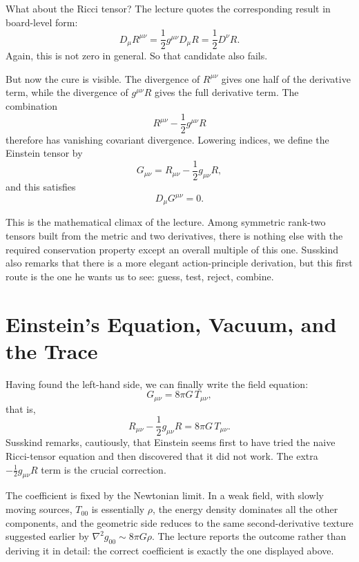 What about the Ricci tensor? The lecture quotes the corresponding result in board-level form:
\begin{equation}
D_\mu R^{\mu\nu}
=
\frac12 g^{\mu\nu}D_\mu R
=
\frac12 D^\nu R.
\end{equation}
Again, this is not zero in general. So that candidate also fails.

But now the cure is visible. The divergence of \(R^{\mu\nu}\) gives one half of the derivative term, while the divergence of \(g^{\mu\nu}R\) gives the full derivative term. The combination
\begin{equation}
R^{\mu\nu}-\frac12 g^{\mu\nu}R
\end{equation}
therefore has vanishing covariant divergence. Lowering indices, we define the Einstein tensor by
\begin{equation}
G_{\mu\nu}=R_{\mu\nu}-\frac12 g_{\mu\nu}R,
\end{equation}
and this satisfies
\begin{equation}
D_\mu G^{\mu\nu}=0.
\end{equation}

This is the mathematical climax of the lecture. Among symmetric rank-two tensors built from the metric and two derivatives, there is nothing else with the required conservation property except an overall multiple of this one. Susskind also remarks that there is a more elegant action-principle derivation, but this first route is the one he wants us to see: guess, test, reject, combine.

\section{Einstein's Equation, Vacuum, and the Trace}

Having found the left-hand side, we can finally write the field equation:
\begin{equation}
G_{\mu\nu}=8\pi G\,T_{\mu\nu},
\end{equation}
that is,
\begin{equation}
R_{\mu\nu}-\frac12 g_{\mu\nu}R=8\pi G\,T_{\mu\nu}.
\end{equation}
Susskind remarks, cautiously, that Einstein seems first to have tried the naive Ricci-tensor equation and then discovered that it did not work. The extra \(-\frac12 g_{\mu\nu}R\) term is the crucial correction.

The coefficient is fixed by the Newtonian limit. In a weak field, with slowly moving sources, \(T_{00}\) is essentially \(\rho\), the energy density dominates all the other components, and the geometric side reduces to the same second-derivative texture suggested earlier by \(\nabla^2 g_{00}\sim 8\pi G\rho\). The lecture reports the outcome rather than deriving it in detail: the correct coefficient is exactly the one displayed above.

